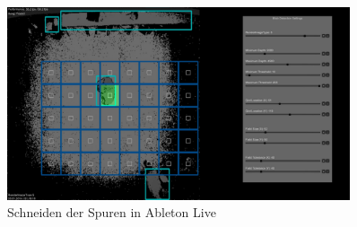\newpage

\begin{figure}[htbp] 
  \centering
     \includegraphics[width=0.9\textwidth]{images/Blob}
  \caption{Schneiden der Spuren in Ableton Live}
  \label{fig:blob}
\end{figure}
